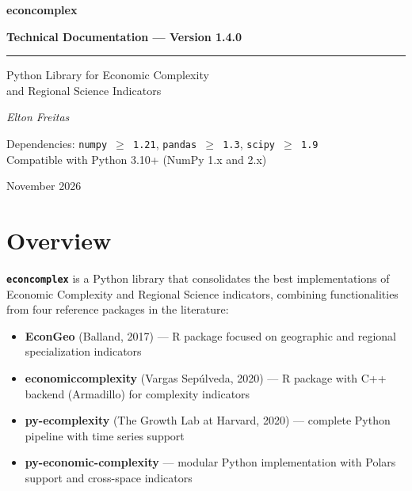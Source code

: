 \documentclass[12pt, a4paper]{article}
\newcommand{\pkg}[1]{\texttt{\textbf{#1}}}
\begin{document}
\begin{titlepage}
  \centering
  \vspace*{3cm}
  {\Huge\bfseries\color{tblhead} econcomplex}\par
  \vspace{0.5cm}
  {\large\bfseries Technical Documentation --- Version 1.4.0}\par
  \vspace{1cm}
  \rule{10cm}{0.8pt}\par
  \vspace{0.8cm}
  {\large Python Library for Economic Complexity\\
  and Regional Science Indicators}\par
  \vspace{2cm}
  {\normalsize
    \textit{Elton Freitas}
  }\par
  \vspace{3cm}
  {\small\color{pygray}
    Dependencies: \texttt{numpy $\geq$ 1.21}, \texttt{pandas $\geq$ 1.3}, \texttt{scipy $\geq$ 1.9}\\[4pt]
    Compatible with Python 3.10+ (NumPy 1.x and 2.x)
  }\par
  \vfill
  {\small\color{pygray} November 2026}
\end{titlepage}

\tableofcontents
\newpage

\section{Overview}

\pkg{econcomplex} is a Python library that consolidates the best
implementations of Economic Complexity and Regional Science indicators,
combining functionalities from four reference packages in the literature:

\begin{itemize}[leftmargin=1.5em]
  \item \textbf{EconGeo} (Balland, 2017) --- R package focused on geographic
        and regional specialization indicators
  \item \textbf{economiccomplexity} (Vargas Sep\'{u}lveda, 2020) --- R package
        with C++ backend (Armadillo) for complexity indicators
  \item \textbf{py-ecomplexity} (The Growth Lab at Harvard, 2020) --- complete
        Python pipeline with time series support
  \item \textbf{py-economic-complexity} --- modular Python implementation
        with Polars support and cross-space indicators
\end{itemize}
\end{document}
